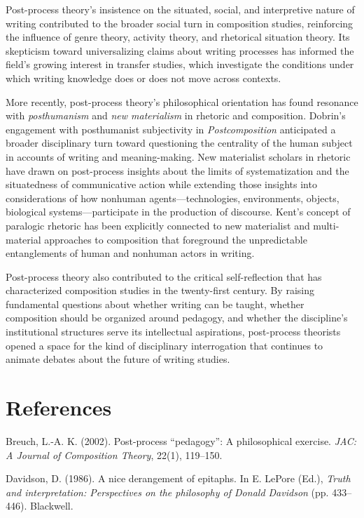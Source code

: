 \documentclass[12pt]{article}
\begin{document}
Post-process theory's insistence on the situated, social, and interpretive nature of writing contributed to the broader social turn in composition studies, reinforcing the influence of genre theory, activity theory, and rhetorical situation theory. Its skepticism toward universalizing claims about writing processes has informed the field's growing interest in transfer studies, which investigate the conditions under which writing knowledge does or does not move across contexts.

More recently, post-process theory's philosophical orientation has found resonance with \textit{posthumanism} and \textit{new materialism} in rhetoric and composition. Dobrin's engagement with posthumanist subjectivity in \textit{Postcomposition} anticipated a broader disciplinary turn toward questioning the centrality of the human subject in accounts of writing and meaning-making. New materialist scholars in rhetoric have drawn on post-process insights about the limits of systematization and the situatedness of communicative action while extending those insights into considerations of how nonhuman agents---technologies, environments, objects, biological systems---participate in the production of discourse. Kent's concept of paralogic rhetoric has been explicitly connected to new materialist and multi-material approaches to composition that foreground the unpredictable entanglements of human and nonhuman actors in writing.

Post-process theory also contributed to the critical self-reflection that has characterized composition studies in the twenty-first century. By raising fundamental questions about whether writing can be taught, whether composition should be organized around pedagogy, and whether the discipline's institutional structures serve its intellectual aspirations, post-process theorists opened a space for the kind of disciplinary interrogation that continues to animate debates about the future of writing studies.

\section*{References}

Breuch, L.-A. K. (2002). Post-process ``pedagogy'': A philosophical exercise. \textit{JAC: A Journal of Composition Theory}, 22(1), 119--150.

Davidson, D. (1986). A nice derangement of epitaphs. In E. LePore (Ed.), \textit{Truth and interpretation: Perspectives on the philosophy of Donald Davidson} (pp. 433--446). Blackwell.
\end{document}
